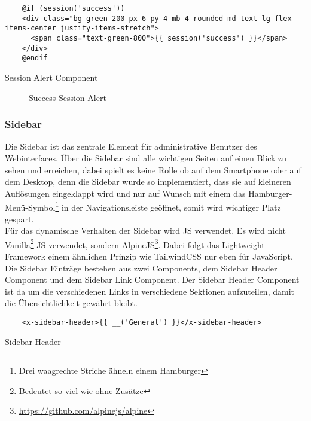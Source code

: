 \begin{listing}[H]
  \begin{verbatim}
    @if (session('success'))
    <div class="bg-green-200 px-6 py-4 mb-4 rounded-md text-lg flex items-center justify-items-stretch">
      <span class="text-green-800">{{ session('success') }}</span>
    </div>
    @endif
  \end{verbatim}
  \caption{Session Alert Component}
\end{listing}

\begin{figure}[H]
  \centering
  \caption{Success Session Alert}
\end{figure}

\subsubsection{Sidebar}
Die Sidebar ist das zentrale Element für administrative Benutzer des
Webinterfaces. Über die Sidebar sind alle wichtigen Seiten auf einen Blick zu
sehen und erreichen, dabei spielt es keine Rolle ob auf dem Smartphone oder auf
dem Desktop, denn die Sidebar wurde so implementiert, dass sie auf kleineren
Auflösungen eingeklappt wird und nur auf Wunsch mit einem das
Hamburger-Menü-Symbol\footnote{Drei waagrechte Striche ähneln einem Hamburger}
in der Navigationsleiste geöffnet, somit wird wichtiger Platz gespart.\\

Für das dynamische Verhalten der Sidebar wird \acl*{JS} verwendet. Es wird nicht
Vanilla\footnote{Bedeutet so viel wie ohne Zusätze} \acl*{JS} verwendet, sondern
AlpineJS\footnote{\url{https://github.com/alpinejs/alpine}}. Dabei folgt das
Lightweight Framework einem ähnlichen Prinzip wie TailwindCSS nur eben für
JavaScript.\\

Die Sidebar Einträge bestehen aus zwei Components, dem Sidebar Header Component
und dem Sidebar Link Component. Der Sidebar Header Component ist da um die verschiedenen Links in verschiedene
Sektionen aufzuteilen, damit die Übersichtlichkeit gewährt bleibt.

\begin{listing}[H]
  \begin{verbatim}
    <x-sidebar-header>{{ __('General') }}</x-sidebar-header>
  \end{verbatim}
  \caption{Sidebar Header}
\end{listing}

